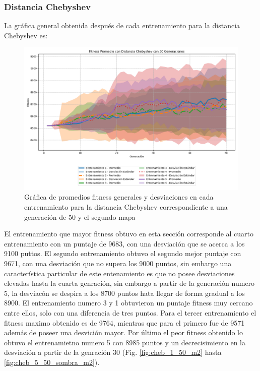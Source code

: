 \documentclass[conference]{IEEEtran}
\begin{document}
\subsubsection{Distancia Chebyshev}
La gráfica general obtenida después de cada entrenamiento para la distancia Chebyshev es:
\begin{figure}[H]
    \centering
    \includegraphics[width=0.9\linewidth]{Chebyshev/Mapa2/Fitness_Prom_Map2_Cheby_50Gen.png}
    \caption{Gráfica de promedios fitness generales y desviaciones en cada entrenamiento para la distancia Chebyshev correspondiente a una generación de 50 y el segundo mapa}
    \label{fig:chy_mapa_2}
\end{figure}
El entrenamiento que mayor fitness obtuvo en esta sección corresponde al cuarto entrenamiento con un puntaje de 9683, con una desviación que se acerca a los 9100 puttos. El segundo entrenamiento obtuvo el segundo mejor puntaje con 9671, con una desviación que no supera los 9000 puntos, sin embargo una característica particular de este entenamiento es que no posee desviaciones elevadas hasta la cuarta genración, sin embargo a partir de la generación numero 5, la desviacón se despira a los 8700 puntos hata llegar de forma gradual a los 8900. El entrenamiento numero 3 y 1 obtuvieron un puntaje fitness muy cercano entre ellos, solo con una diferencia de tres puntos. Para el tercer entrenamiento el fitness maximo obtenido es de 9764, mientras que para el primero fue de 9571 además de poseer una desvición mayor. Por último el peor fitness obtenido lo obtuvo el entrenamietno numero 5 con 8985 puntos y un decrecisimiento en la desviación a partir de la genración 30 (Fig. \ref{fig:cheb_1_50_m2} hasta \ref{fig:cheb_5_50_sombra_m2}).
\end{document}
